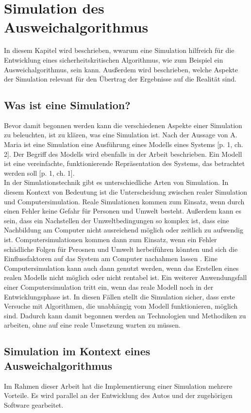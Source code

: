 \section{Simulation des Ausweichalgorithmus}

In diesem Kapitel wird beschrieben, wwarum eine Simulation hilfreich für die Entwicklung eines 
sicherheitskritischen Algorithmus, wie zum Beispiel ein Ausweichalgorithmus, sein kann.
Ausßerdem wird beschrieben, welche Aspekte der Simulation relevant für den Übertrag der Ergebnisse auf die Realität sind.

 \subsection{Was ist eine Simulation?}
 \label{Simulation}
 Bevor damit begonnen werden kann die verschiedenen Aspekte einer Simulation zu beleuchten, ist zu klären, was eine Simulation ist.
 Nach der Aussage von A. Maria ist eine Simulation eine Ausführung eines Modells eines Systems \cite{maria1997introduction}[p. 1, ch. 2].
Der Begriff des Modells wird ebenfalls in der Arbeit beschrieben. Ein Modell ist eine vereinfachte, funktionierende Repräsentation des Systems, das betrachtet werden soll \cite{maria1997introduction}[p. 1, ch. 1].\\
In der Simulationstechnik gibt es unterschiedliche Arten von Simulation. In diesem Kontext von Bedeutung ist die Unterscheidung zwischen realer Simulation und Computersimulation. Reale Simulationen kommen zum Einsatz, wenn durch einen Fehler keine Gefahr für Personen und Umwelt besteht.
Außerdem kann es sein, dass ein Nachstellen der Umweltbedingungen so komplex ist, dass eine Nachbildung am Computer nicht ausreichend möglich oder zeitlich zu aufwendig ist. Computersimulationen kommen dann zum Einsatz, wenn ein Fehler schädliche Folgen für Perosnen und Umwelt
herbeiführen könnten und sich die Einflussfaktoren auf das System am Computer nachahmen lassen \cite{Britannica2023}. 
Eine Computersimulation kann auch dann genutzt werden, wenn das Erstellen eines realen Modells nicht möglich oder nicht rentabel ist. Ein weiterer Anwendungsfall einer Computersimulation tritt ein, wenn das reale Modell noch in der Entwicklungsphase ist. 
In diesen Fällen stellt die Simulation sicher, dass erste Versuche mit Algorithmen, die unabhängig vom Modell funktionieren, möglich sind. 
Dadurch kann damit begonnen werden an Technologien und Methodiken zu arbeiten, ohne auf eine reale Umsetzung warten zu müssen.
\subsection{Simulation im Kontext eines Ausweichalgorithmus}
Im Rahmen dieser Arbeit hat die Implementierung einer Simulation mehrere Vorteile. 
Es wird parallel an der Entwicklung des Autos und der zugehörigen Software gearbeitet.

